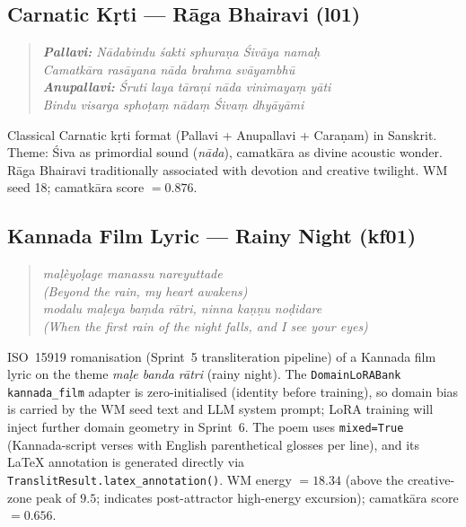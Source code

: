 \documentclass[journal,onecolumn,11pt]{IEEEtran}
\begin{document}
\subsection{Carnatic Kṛti --- Rāga Bhairavi (l01)}\label{sec:l01}

\begin{quote}
\small\itshape
\textbf{Pallavi:} Nādabindu śakti sphuraṇa Śivāya namaḥ \\
Camatkāra rasāyana nāda brahma svāyambhū \\[2pt]
\textbf{Anupallavi:} Śruti laya tāraṇi nāda vinimayaṃ yāti \\
Bindu visarga sphoṭaṃ nādaṃ Śivaṃ dhyāyāmi
\end{quote}

Classical Carnatic kṛti format (Pallavi + Anupallavi + Caraṇam) in Sanskrit.
Theme: Śiva as primordial sound (\emph{nāda}), camatkāra as divine acoustic wonder.
Rāga Bhairavi traditionally associated with devotion and creative twilight.
WM seed 18; camatkāra score $= 0.876$.

\subsection{Kannada Film Lyric --- Rainy Night (kf01)}\label{sec:kf01}

\begin{quote}
\small\itshape
ma\d{l}\`{e}yo\d{l}age manassu nareyuttade \\
(Beyond the rain, my heart awakens) \\
modalu ma\d{l}eya ba\d{m}da r\={a}tri, ninna ka\d{n}\d{n}u no\d{d}idare \\
(When the first rain of the night falls, and I see your eyes)
\end{quote}

ISO~15919 romanisation (Sprint~5 transliteration pipeline) of a Kannada film lyric
on the theme \emph{ma\d{l}e banda r\={a}tri} (rainy night).
The \texttt{DomainLoRABank} \texttt{kannada\_film} adapter is zero-initialised
(identity before training), so domain bias is carried by the WM seed text and
LLM system prompt; LoRA training will inject further domain geometry in Sprint~6.
The poem uses \texttt{mixed=True} (Kannada-script verses with English parenthetical
glosses per line), and its \LaTeX{} annotation is generated directly via
\texttt{TranslitResult.latex\_annotation()}.
WM energy $= 18.34$ (above the creative-zone peak of $9.5$; indicates
post-attractor high-energy excursion); camatkāra score $= 0.656$.
\end{document}
